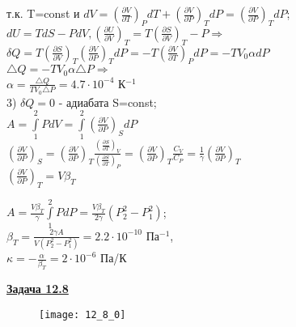 \documentclass[12pt]{article}
\begin{document}
т.к. T=const и $dV=\left( \frac{\partial V}{\partial T} \right)_P dT+\left( \frac{\partial V}{\partial P} \right)_T dP=\left( \frac{\partial V}{\partial P} \right)_T dP$;\\

$dU=TdS-PdV, \left( \frac{\partial U}{\partial V} \right)_T =T\left( \frac{\partial S}{\partial V} \right)_T-P\Rightarrow$\\

$\delta Q=T\left( \frac{\partial S}{\partial V} \right)_T \left( \frac{\partial V}{\partial P} \right)_T dP=-T\left( \frac{\partial V}{\partial T} \right)_P dP=-TV_0\alpha dP$\\

$\triangle Q=-TV_0\alpha \triangle P\Rightarrow$\\

$\alpha=\frac{\triangle Q}{TV_0 \triangle P}=4.7\cdot10^{-4}$ К$^{-1}$\\

3) $\delta Q=0$ - адиабата S=const;\\

$A=\int\limits_1^2 PdV=\int\limits_1^2 \left( \frac{\partial V}{\partial P} \right)_S dP$\\

$\left( \frac{\partial V}{\partial P} \right)_S=\left( \frac{\partial V}{\partial P} \right)_T \frac{\left( \frac{\partial S}{\partial T} \right)_V}{\left( \frac{\partial S}{\partial T} \right)_P}=\left( \frac{\partial V}{\partial P} \right)_T\frac{C_V}{C_P}=\frac{1}{\gamma}\left( \frac{\partial V}{\partial P} \right)_T$\\

$\left( \frac{\partial V}{\partial P} \right)_T=V\beta_T$

$A=\frac{V\beta_T}{\gamma}\int\limits_1^2 PdP=\frac{V\beta_T}{2\gamma}(P_2^2-P_1^2)$;\\

$\beta_T=\frac{2\gamma A}{V(P_2^2-P_1^2)}=2.2\cdot10^{-10}$ Па$^{-1}$,\\

$\kappa=-\frac{\alpha}{\beta_T}=2\cdot10^{-6}$ Па/К




\newpage

{\underline\bf Задача 12.8 }

\begin{figure}[h]
\texttt{[image: 12\_8\_0]}
\end{figure}
\end{document}
